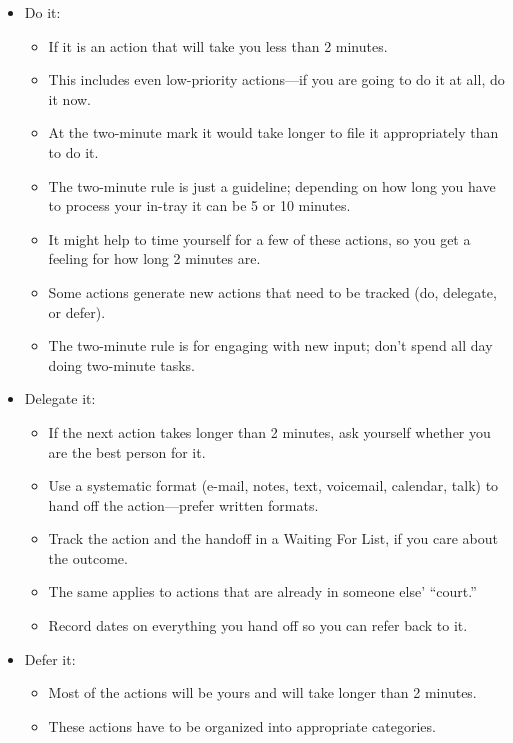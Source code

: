 \documentclass{article}
\begin{document}
\begin{itemize}
  \item Do it:
  \begin{itemize}
    \item If it is an action that will take you less than 2 minutes.
    \item This includes even low-priority actions---if you are going to do it at all, do it now.
    \item At the two-minute mark it would take longer to file it appropriately than to do it.
    \item The two-minute rule is just a guideline; depending on how long you have to process your in-tray it can be 5 or 10 minutes.
    \item It might help to time yourself for a few of these actions, so you get a feeling for how long 2 minutes are.
    \item Some actions generate new actions that need to be tracked (do, delegate, or defer).
    \item The two-minute rule is for engaging with new input; don't spend all day doing two-minute tasks.
  \end{itemize}
  \item Delegate it:
  \begin{itemize}
    \item If the next action takes longer than 2 minutes, ask yourself whether you are the best person for it.
    \item Use a systematic format (e-mail, notes, text, voicemail, calendar, talk) to hand off the action---prefer written formats.
    \item Track the action and the handoff in a Waiting For List, if you care about the outcome.
    \item The same applies to actions that are already in someone else' ``court.''
    \item Record dates on everything you hand off so you can refer back to it.
  \end{itemize}
  \item Defer it:
  \begin{itemize}
    \item Most of the actions will be yours and will take longer than 2 minutes.
    \item These actions have to be organized into appropriate categories.
  \end{itemize}
\end{itemize}
\end{document}
